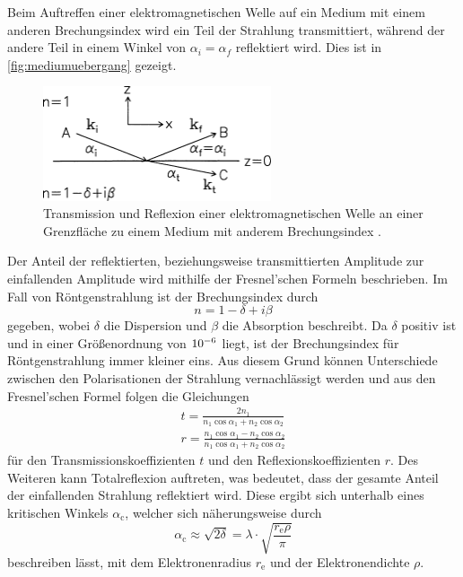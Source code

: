 Beim Auftreffen einer elektromagnetischen Welle auf ein Medium mit einem anderen Brechungsindex wird ein Teil der Strahlung transmittiert,
während der andere Teil in einem Winkel von $\alpha_i = \alpha_f$ reflektiert wird.
Dies ist in \autoref{fig:mediumuebergang} gezeigt.
\begin{figure}
    \centering
    \includegraphics[width=0.6\textwidth]{content/img/Tolan_2.1.png}
    \caption{Transmission und Reflexion einer elektromagnetischen Welle an einer Grenzfläche zu einem Medium mit anderem Brechungsindex \cite{tolan}.}
    \label{fig:mediumuebergang}
\end{figure}
Der Anteil der reflektierten,
beziehungsweise transmittierten Amplitude zur einfallenden Amplitude wird mithilfe der Fresnel'schen Formeln beschrieben.
Im Fall von Röntgenstrahlung ist der Brechungsindex durch
\begin{equation}
    n = 1 - \delta + i \beta
    \label{eqn:brechungsindex}
\end{equation}
gegeben,
wobei $\delta$ die Dispersion und $\beta$ die Absorption beschreibt.
Da $\delta$ positiv ist und in einer Größenordnung von $\num{e{-6}}$ liegt,
ist der Brechungsindex für Röntgenstrahlung immer kleiner eins.
Aus diesem Grund können Unterschiede zwischen den Polarisationen der Strahlung vernachlässigt werden und aus den Fresnel'schen Formel folgen die Gleichungen
\begin{gather}
    t = \frac{2n_1}{n_1 \cos{\alpha_1} + n_2 \cos{\alpha_2}} \\
    r = \frac{n_1 \cos{\alpha_1} - n_2 \cos{\alpha_2}}{n_1 \cos{\alpha_1} + n_2 \cos{\alpha_2}}
\end{gather}
für den Transmissionskoeffizienten $t$ und den Reflexionskoeffizienten $r$.
Des Weiteren kann Totalreflexion auftreten,
was bedeutet,
dass der gesamte Anteil der einfallenden Strahlung reflektiert wird.
Diese ergibt sich unterhalb eines kritischen Winkels $\alpha_\text{c}$,
welcher sich näherungsweise durch
\begin{equation}
    \alpha_\text{c} \approx \sqrt{2 \delta} = \lambda \cdot \sqrt{\frac{r_\text{e} \rho}{\pi}}
\end{equation}
beschreiben lässt,
mit dem Elektronenradius $r_\text{e}$ und der Elektronendichte $\rho$.

